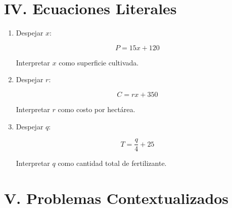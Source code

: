 \documentclass[12pt]{article}
\begin{document}
	\section*{IV. Ecuaciones Literales}
	
	\begin{enumerate}[label=\textbf{\arabic*.}, start=9]
		
		\item Despejar \(x\):
		
		\[
		P = 15x + 120
		\]
		
		Interpretar \(x\) como superficie cultivada.
		
		
		\item Despejar \(r\):
		
		\[
		C = rx + 350
		\]
		
		Interpretar \(r\) como costo por hectárea.
		
		
		\item Despejar \(q\):
		
		\[
		T = \frac{q}{4} + 25
		\]
		
		Interpretar \(q\) como cantidad total de fertilizante.
		
	\end{enumerate}
	
	\section*{V. Problemas Contextualizados}
	
\end{document}
